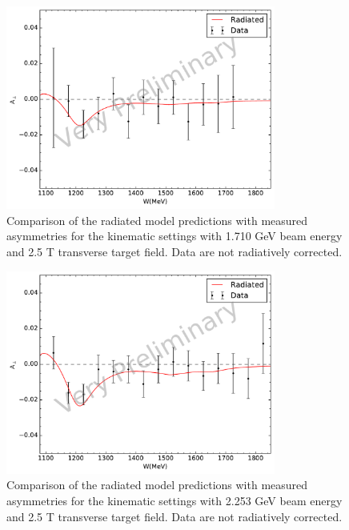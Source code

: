 \begin{figure}[p!]
  \centering
  \includegraphics[width=0.79\textwidth]{figs/asymmetry-data-model-17102590.pdf}
  \caption[Asymmetries with $E=1.710$ GeV and $B=2.5$ T.]{Comparison of the radiated model predictions with measured asymmetries for the kinematic settings with 1.710 GeV beam energy and 2.5 T transverse target field. Data are not radiatively corrected. \label{C8S2F5}}
\end{figure}

\begin{figure}[p!]
  \centering
  \includegraphics[width=0.79\textwidth]{figs/asymmetry-data-model-22532590.pdf}
  \caption[Asymmetries with $E=2.253$ GeV and $B=2.5$ T.]{Comparison of the radiated model predictions with measured asymmetries for the kinematic settings with 2.253 GeV beam energy and 2.5 T transverse target field. Data are not radiatively corrected. \label{C8S2F6}}
\end{figure}

